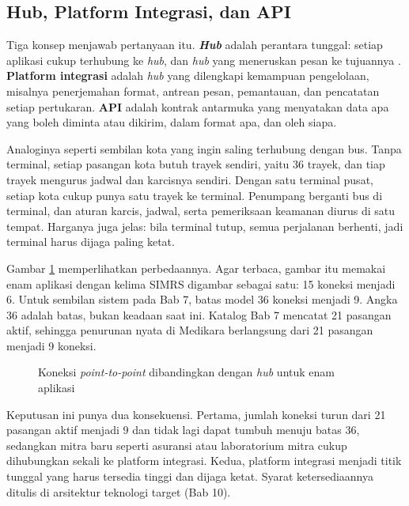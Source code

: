 \subsection*{Hub, Platform Integrasi, dan API}

Tiga konsep menjawab pertanyaan itu. \textbf{\textit{Hub}} adalah perantara
tunggal: setiap aplikasi cukup terhubung ke \textit{hub}, dan \textit{hub}
yang meneruskan pesan ke tujuannya \cite{hohpe2003}.
\textbf{Platform integrasi} adalah \textit{hub} yang dilengkapi kemampuan
pengelolaan, misalnya penerjemahan format, antrean pesan, pemantauan, dan
pencatatan setiap pertukaran. \textbf{API} adalah kontrak antarmuka yang menyatakan data apa yang boleh
diminta atau dikirim, dalam format apa, dan oleh siapa.

Analoginya seperti sembilan kota yang ingin saling terhubung dengan bus.
Tanpa terminal, setiap pasangan kota butuh trayek sendiri, yaitu 36 trayek,
dan tiap trayek mengurus jadwal dan karcisnya sendiri. Dengan satu terminal
pusat, setiap kota cukup punya satu trayek ke terminal. Penumpang berganti
bus di terminal, dan aturan karcis, jadwal, serta pemeriksaan keamanan diurus
di satu tempat. Harganya juga jelas: bila terminal tutup, semua perjalanan
berhenti, jadi terminal harus dijaga paling ketat.

Gambar \ref{fig:ch09-p2p-ke-hub} memperlihatkan perbedaannya. Agar terbaca,
gambar itu memakai enam aplikasi dengan kelima SIMRS digambar sebagai satu:
15 koneksi menjadi 6. Untuk sembilan sistem pada Bab 7, batas model 36 koneksi
menjadi 9. Angka 36 adalah batas, bukan keadaan saat ini. Katalog Bab 7 mencatat
21 pasangan aktif, sehingga penurunan nyata di Medikara berlangsung dari 21
pasangan menjadi 9 koneksi.

\begin{figure}[!htb]
  \centering
  
  \caption{Koneksi \textit{point-to-point} dibandingkan dengan
           \textit{hub} untuk enam aplikasi}
  \label{fig:ch09-p2p-ke-hub}
\end{figure}

Keputusan ini punya dua konsekuensi. Pertama, jumlah koneksi turun dari 21
pasangan aktif menjadi 9 dan tidak lagi dapat tumbuh menuju batas 36, sedangkan
mitra baru seperti asuransi atau laboratorium mitra cukup dihubungkan sekali ke
platform integrasi. Kedua, platform integrasi menjadi
titik tunggal yang harus tersedia tinggi dan dijaga ketat. Syarat
ketersediaannya ditulis di arsitektur teknologi target (Bab 10).

